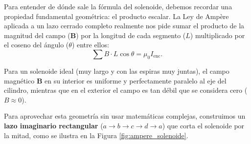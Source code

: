 \documentclass[11pt,a4paper]{book}
\begin{document}
Para entender de dónde sale la fórmula del solenoide, debemos recordar una propiedad fundamental geométrica: el producto escalar. La Ley de Ampère aplicada a un lazo cerrado completo realmente nos pide sumar el producto de la magnitud del campo ($\boldsymbol{B}$) por la longitud de cada segmento ($L$) multiplicado por el coseno del ángulo ($\theta$) entre ellos:
\begin{equation}
    \sum B \cdot L \cos\theta = \mu_0 I_{\text{enc}}.
\end{equation}

Para un solenoide ideal (muy largo  y con las espiras muy juntas), el campo magnético $\boldsymbol{B}$ en su interior es uniforme y perfectamente paralelo al eje del cilindro, mientras que en el exterior el campo es tan débil que se considera cero ($B \approx 0$). 

Para aprovechar esta geometría sin usar matemáticas complejas, construimos un \textbf{lazo imaginario rectangular} ($a \rightarrow b \rightarrow c \rightarrow d \rightarrow a$) que corta el solenoide por la mitad, como se ilustra en la Figura \ref{fig:ampere_solenoide}.
\end{document}
